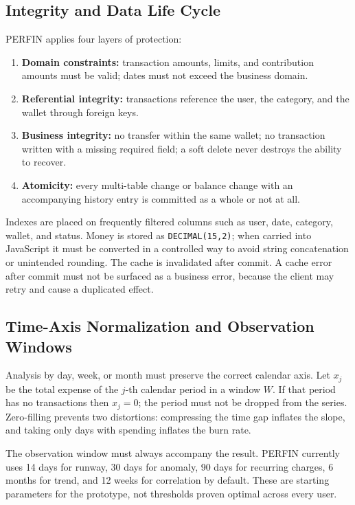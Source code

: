 \subsection{Integrity and Data Life Cycle}

PERFIN applies four layers of protection:

\begin{enumerate}
  \item \textbf{Domain constraints:} transaction amounts, limits, and
  contribution amounts must be valid; dates must not exceed the business
  domain.
  \item \textbf{Referential integrity:} transactions reference the user,
  the category, and the wallet through foreign keys.
  \item \textbf{Business integrity:} no transfer within the same wallet;
  no transaction written with a missing required field; a soft delete
  never destroys the ability to recover.
  \item \textbf{Atomicity:} every multi-table change or balance change
  with an accompanying history entry is committed as a whole or not at
  all.
\end{enumerate}

Indexes are placed on frequently filtered columns such as user, date,
category, wallet, and status. Money is stored as \texttt{DECIMAL(15,2)};
when carried into JavaScript it must be converted in a controlled way to
avoid string concatenation or unintended rounding. The cache is
invalidated after commit. A cache error after commit must not be
surfaced as a business error, because the client may retry and cause a
duplicated effect.

\subsection{Time-Axis Normalization and Observation Windows}

Analysis by day, week, or month must preserve the correct calendar
axis. Let $x_j$ be the total expense of the $j$-th calendar period in a
window $W$. If that period has no transactions then $x_j=0$; the period
must not be dropped from the series. Zero-filling prevents two
distortions: compressing the time gap inflates the slope, and taking
only days with spending inflates the burn rate.

The observation window must always accompany the result. PERFIN
currently uses 14 days for runway, 30 days for anomaly, 90 days for
recurring charges, 6 months for trend, and 12 weeks for correlation by
default. These are starting parameters for the prototype, not thresholds
proven optimal across every user.

